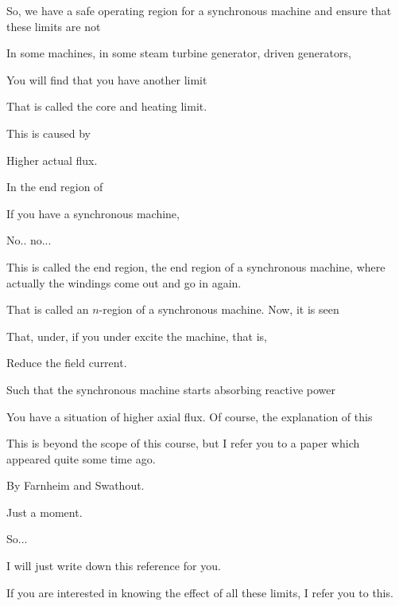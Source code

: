 \documentclass{article}
\begin{document}
So, we have a safe operating region for a synchronous machine and ensure that these limits are not

In some machines, in some steam turbine generator, driven generators,

You will find that you have another limit

That is called the core and heating limit.





This is caused by

Higher actual flux.







In the end region of

If you have a synchronous machine,



No.. no...

This is called the end region, the end region of a synchronous machine, where actually the windings come out and go in again.

That is called an $n$-region of a synchronous machine. Now, it is seen

That, under, if you under excite the machine, that is,

Reduce the field current.

Such that the synchronous machine starts absorbing reactive power

You have a situation of higher axial flux. Of course, the explanation of this

This is beyond the scope of this course, but I refer you to a paper which appeared quite some time ago.

By Farnheim and Swathout.

Just a moment.

So...

I will just write down this reference for you.

If you are interested in knowing the effect of all these limits, I refer you to this.
\end{document}
